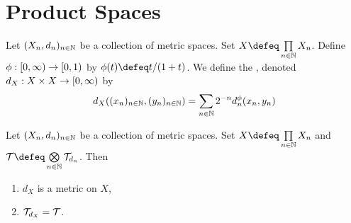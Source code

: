 \documentclass{book}
\begin{document}
\newpage
\section{Product Spaces}

\begin{defn} 
	Let $(X_n, d_n)_{n \in \mathbb{N}}$ be a collection of metric spaces. Set $X \defeq \prod\limits_{n \in \N} X_n$. Define $\phi:[0,\infty) \rightarrow [0,1)$ by $\phi(t) \defeq t/(1 + t)$. We define the , denoted $d_X: X \times X \rightarrow [0,\infty)$ by 
	$$d_X((x_n)_{n \in \mathbb{N}}, (y_n)_{n \in \mathbb{N}}) = \sum_{n \in \mathbb{N}} 2^{-n} d_n^{\phi}(x_n, y_n)$$ 
\end{defn}

\begin{ex} 
	Let $(X_n, d_n)_{n \in \mathbb{N}}$ be a collection of metric spaces. Set $X \defeq \prod\limits_{n \in \N} X_n$ and $\MT \defeq \bigotimes\limits_{n \in \N} \MT_{d_n}$.
	Then 
	\begin{enumerate}
		\item $d_X$ is a metric on $X$,
		\item $\mathcal{T}_{d_X} = \mathcal{T}$.
	\end{enumerate} 
\end{ex}
\end{document}
